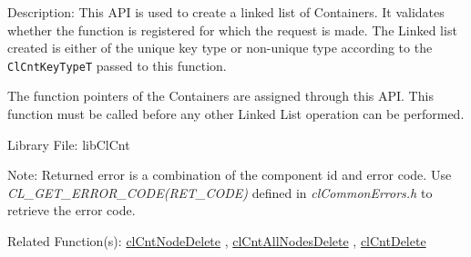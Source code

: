 \begin{Desc}
\item[Description:]This API is used to create a linked list of Containers. It validates whether the function is registered for which the request is 
made. The Linked list created is either of the unique key type or non-unique type according to the {\tt{ClCntKeyTypeT}} passed to this function.
 \par 
 The function pointers of the Containers are assigned through this API. This function must be called before any other Linked List operation can be performed.
\end{Desc}
\begin{Desc}
\item[Library File:]lib\-Cl\-Cnt\end{Desc}
\begin{Desc}
\item[Note:]Returned error is a combination of the component id and error code. Use \textit{CL\_\-GET\_\-ERROR\_\-CODE(RET\_\-CODE)} defined in 
\textit{clCommonErrors.h} to retrieve the error code.\end{Desc}
\begin{Desc}
\item[Related Function(s):]\hyperlink{pagecnt108}{cl\-Cnt\-Node\-Delete} , \hyperlink{pagecnt106}{cl\-Cnt\-All\-Nodes\-Delete} , 
\hyperlink{pagecnt120}{cl\-Cnt\-Delete} \end{Desc}


\newpage
